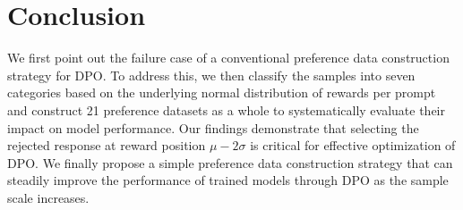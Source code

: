\section{Conclusion}
\label{conclusion}


We first point out the failure case of a conventional preference data construction strategy for DPO. 
To address this,  we then classify the samples into seven categories based on the underlying normal distribution of rewards per prompt and construct 21 preference datasets as a whole to systematically evaluate their impact on model performance.  
Our findings demonstrate that selecting the rejected response at reward position $\mu - 2\sigma$ is critical for effective optimization of DPO.
We finally propose a simple preference data construction strategy that can steadily improve the performance of trained models through DPO as the sample scale increases.


